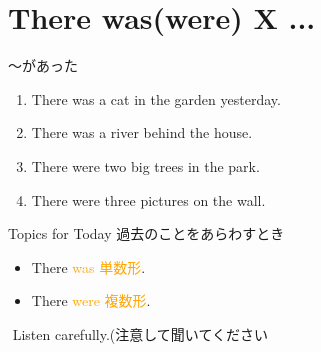 \documentclass[aspectratio=169]{beamer}
\newcommand{\myaudio}[1]{\href{#1}{\faVolumeUp}}
\begin{document}
\section{There was(were) X ...}
\begin{frame}[plain]{〜があった}

\begin{enumerate}
 \item There was a cat in the garden yesterday.\pause
 \item There was a river behind the house.\pause
 \item There were two big trees in the park.\pause
 \item There were three pictures on the wall.
\end{enumerate}

\pause
\begin{exampleblock}{Topics for Today}
過去のことをあらわすとき
\begin{itemize}
 \item There \textcolor{orange}{was 単数形}.\pause
 \item There \textcolor{orange}{were 複数形}.
\end{itemize}
\end{exampleblock}
\pause
\myaudio{audio/001_there_is_02.mp3}\,\,{}Listen carefully.(注意して聞いてください


\end{frame}
\end{document}
